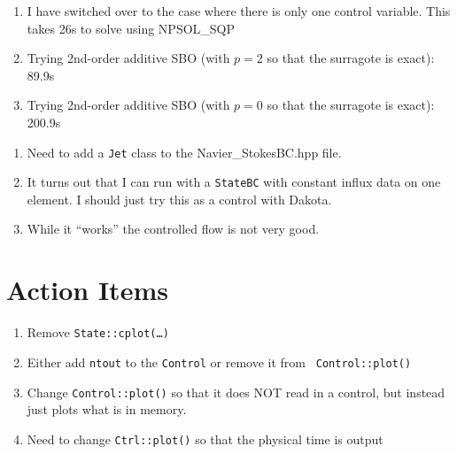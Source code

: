 \documentclass[12pt]{article}
\begin{document}
\begin{enumerate}
\item I have switched over to the case where there is only one control
variable.  This takes 26s to solve using NPSOL_SQP
\item Trying 2nd-order additive SBO (with $p=2$ so that the surragote is
exact): 89.9s
\item Trying 2nd-order additive SBO (with $p=0$ so that the surragote is
exact): 200.9s

\end{enumerate}

\begin{enumerate}
\item Need to add a {\tt Jet} class to the Navier\_StokesBC.hpp file.
\item It turns out that I can run with a {\tt StateBC} with constant influx
data on one element.  I should just try this as a control with Dakota.
\item While it ``works'' the controlled flow is not very good. 
\end{enumerate}


\section{Action Items}

\begin{enumerate}
\item Remove {\tt State::cplot(\dots)}
\item Either add {\tt ntout} to the {\tt Control} or remove it from {\tt
Control::plot()}
\item Change {\tt Control::plot()} so that it does NOT read in a control, but
instead just plots what is in memory.
\item Need to change {\tt Ctrl::plot()} so that the physical time is output
\end{enumerate}




\end{document}
